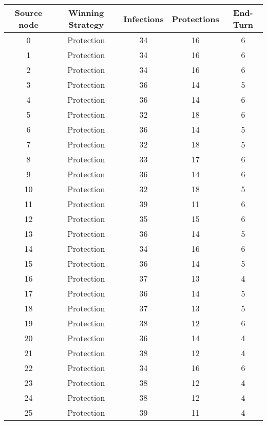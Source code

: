 \documentclass[results.tex]{subfiles}
\begin{document}
\begin{center}
  \begin{tabular}{| c || c | c | c | c |}
    \hline
    {\bfseries Source node} & {\bfseries Winning Strategy} & {\bfseries Infections} & {\bfseries Protections} & {\bfseries End-Turn} \\  %
    \hline\hline
    0 & Protection & 34 & 16 & 6 \\ 
    \hline
    1 & Protection & 34 & 16 & 6 \\ 
    \hline
    2 & Protection & 34 & 16 & 6 \\ 
    \hline
    3 & Protection & 36 & 14 & 5 \\ 
    \hline
    4 & Protection & 36 & 14 & 6 \\ 
    \hline
    5 & Protection & 32 & 18 & 6 \\ 
    \hline
    6 & Protection & 36 & 14 & 5 \\ 
    \hline
    7 & Protection & 32 & 18 & 5 \\ 
    \hline
    8 & Protection & 33 & 17 & 6 \\ 
    \hline
    9 & Protection & 36 & 14 & 6 \\ 
    \hline
    10 & Protection & 32 & 18 & 5 \\ 
    \hline
    11 & Protection & 39 & 11 & 6 \\ 
    \hline
    12 & Protection & 35 & 15 & 6 \\ 
    \hline
    13 & Protection & 36 & 14 & 5 \\ 
    \hline
    14 & Protection & 34 & 16 & 6 \\ 
    \hline
    15 & Protection & 36 & 14 & 5 \\ 
    \hline
    16 & Protection & 37 & 13 & 4 \\ 
    \hline
    17 & Protection & 36 & 14 & 5 \\ 
    \hline
    18 & Protection & 37 & 13 & 5 \\ 
    \hline
    19 & Protection & 38 & 12 & 6 \\ 
    \hline
    20 & Protection & 36 & 14 & 4 \\ 
    \hline
    21 & Protection & 38 & 12 & 4 \\ 
    \hline
    22 & Protection & 34 & 16 & 6 \\ 
    \hline
    23 & Protection & 38 & 12 & 4 \\ 
    \hline
    24 & Protection & 38 & 12 & 4 \\ 
    \hline
    25 & Protection & 39 & 11 & 4 \\ 

\end{tabular}
\end{center}
\end{document}
